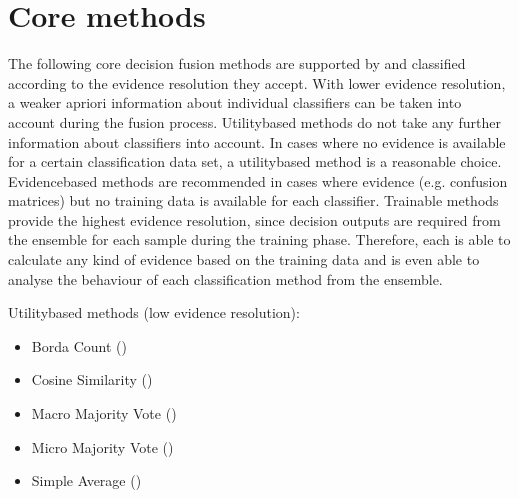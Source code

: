 \documentclass[letterpaper,10pt,english]{sphinxmanual}
\begin{document}
\section{Core methods}
\label{\detokenize{overview:core-methods}}
\sphinxAtStartPar
The following core decision fusion methods are supported by  and classified according to the evidence resolution
they accept. With lower evidence resolution, a weaker a\sphinxhyphen{}priori information about individual classifiers can be taken
into account during the fusion process.
Utility\sphinxhyphen{}based methods do not take any further information about classifiers into account.
In cases where no evidence is available for a certain classification data set, a utility\sphinxhyphen{}based method is a reasonable
choice.
Evidence\sphinxhyphen{}based methods are recommended in cases where evidence (e.g. confusion matrices) but no training data is
available for each classifier.
Trainable methods provide the highest evidence resolution, since decision outputs are required from the ensemble for
each sample during the training phase.
Therefore, each  is able to calculate any kind of evidence based on the training data and is even
able to analyse the behaviour of each classification method from the ensemble.

\sphinxAtStartPar
Utility\sphinxhyphen{}based methods (low evidence resolution):
\begin{itemize}
\item {} 
\sphinxAtStartPar
Borda Count ({\hyperref[\detokenize{pusion.core.borda_count_combiner:bc-cref}]{}})

\item {} 
\sphinxAtStartPar
Cosine Similarity ({\hyperref[\detokenize{pusion.core.cosine_similarity_combiner:cos-cref}]{}})

\item {} 
\sphinxAtStartPar
Macro Majority Vote ({\hyperref[\detokenize{pusion.core.macro_majority_vote_combiner:mamv-cref}]{}})

\item {} 
\sphinxAtStartPar
Micro Majority Vote ({\hyperref[\detokenize{pusion.core.micro_majority_vote_combiner:mimv-cref}]{}})

\item {} 
\sphinxAtStartPar
Simple Average ({\hyperref[\detokenize{pusion.core.simple_average_combiner:avg-cref}]{}})

\end{itemize}
\end{document}
